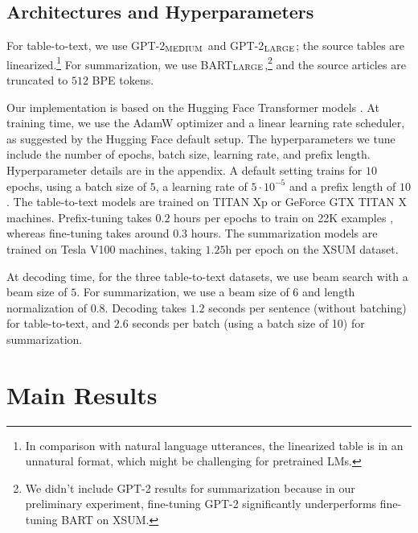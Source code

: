\documentclass[11pt,a4paper]{article}
\newcommand\pl[1]{\textcolor{red}{[PL: #1]}}
\begin{document}
  
\subsection{Architectures and Hyperparameters}
For table-to-text, we use GPT-2$_{\textsc{MEDIUM}}$ and GPT-2$_{\textsc{LARGE}}$; the source tables are linearized.\footnote{In comparison with natural language utterances, the linearized table is in an unnatural format, which might be challenging for pretrained LMs.} 
For summarization, we use BART$_{\textsc{LARGE}}$,\footnote{We didn't include GPT-2 results for summarization because in our preliminary experiment, fine-tuning GPT-2 significantly underperforms fine-tuning BART on XSUM.} and the source articles are truncated to $512$ BPE tokens. 

Our implementation is based on the Hugging Face Transformer models \cite{wolf-etal-2020-transformers}. At training time, we use the AdamW optimizer \cite{loshchilov2018decoupled} and a linear learning rate scheduler, as suggested by the Hugging Face default setup.  The hyperparameters we tune include the number of epochs, batch size, learning rate, and prefix length. Hyperparameter details are in the appendix. A default setting trains for $10$ epochs, using a batch size of $5$, a learning rate of $5 \cdot 10^{-5}$ and a prefix length of $10$. The table-to-text models are trained on TITAN Xp or GeForce GTX TITAN X machines. 
Prefix-tuning takes $0.2$ hours per epochs to train on 22K examples , whereas fine-tuning takes around $0.3$ hours. 
The summarization models are trained on Tesla V100 machines, taking $1.25$h per epoch on the XSUM dataset. 

At decoding time, for the three table-to-text datasets, we use beam search with a beam size of $5$. For summarization, we use a beam size of $6$ and length normalization of $0.8$. 
Decoding takes $1.2$ seconds per sentence (without batching) for table-to-text, and $2.6$ seconds per batch (using a batch size of 10) for summarization. 
\section{Main Results}
\end{document}
